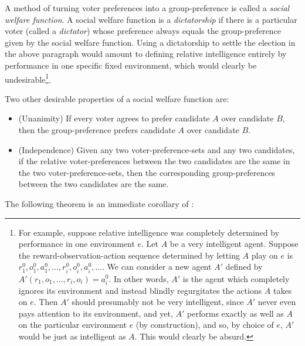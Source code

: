 \documentclass[twoside,11pt]{article}
\begin{document}
A method of turning voter preferences into a group-preference is
called a \emph{social welfare function}.
A social welfare function is a \emph{dictatorship} if there is a particular voter
(called a \emph{dictator}) whose preference
always equals the group-preference given by the social welfare function.
Using a dictatorship to settle the election in
the above paragraph would amount to defining relative intelligence entirely by performance
in one specific fixed environment, which would clearly be undesirable\footnote{For example,
suppose relative intelligence was completely determined by performance
in one environment $e$. Let $A$ be a very intelligent agent. Suppose the
reward-observation-action sequence determined by letting $A$ play on $e$
is $r^0_1,o^0_1,a^0_1,\ldots,r^0_i,o^0_i,a^0_i,\ldots$.
We can consider a new agent $A'$ defined by $A'(r_1,o_1,\ldots,r_i,o_i)=a^0_i$.
In other words, $A'$ is the agent which completely ignores its environment
and instead blindly regurgitates the actions $A$ takes on $e$. Then $A'$ should
presumably not be very intelligent, since $A'$ never even pays attention to its
environment, and yet, $A'$ performs exactly as well as $A$ on the particular environment
$e$ (by construction), and so, by choice of $e$, $A'$ would be just as intelligent as $A$.
This would clearly be absurd.}.

Two other desirable properties of a social welfare function are:
\begin{itemize}
    \item
    (Unanimity)
    If every voter agrees to prefer candidate $A$ over candidate $B$, then
    the group-preference prefers candidate $A$ over candidate $B$.
    \item
    (Independence)
    Given any two voter-preference-sets and any
    two candidates, if the relative voter-preferences
    between the two candidates are the same in the two voter-preference-sets, then the
    corresponding group-preferences between the two candidates are the same.
\end{itemize}
The following theorem is an immediate corollary of \citet{kirman}:
\end{document}
